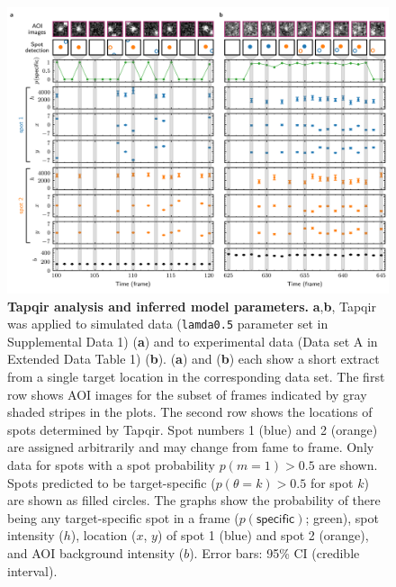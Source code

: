 \begin{figure}[h]
\centering
\includegraphics[width=\textwidth]{figures/figure3.png}
\caption{\textbf{Tapqir analysis and inferred model parameters.} \textbf{a},\textbf{b}, Tapqir was applied to simulated data (\texttt{lamda0.5} parameter set in Supplemental Data 1) (\textbf{a}) and to experimental data (Data set A in Extended Data Table 1) (\textbf{b}). (\textbf{a}) and (\textbf{b}) each show a short extract from a single target location in the corresponding data set. The first row shows AOI images for the subset of frames indicated by gray shaded stripes in the plots. The second row shows the locations of spots determined by Tapqir. Spot numbers 1 (blue) and 2 (orange) are assigned arbitrarily and may change from fame to frame. Only data for spots with a spot probability $p(m=1) > 0.5$ are shown. Spots predicted to be target-specific ($p(\theta=k)>0.5$ for spot $k$) are shown as filled circles. The graphs show the probability of there being any target-specific spot in a frame ($p(\mathsf{specific})$; green), spot intensity ($h$), location ($x$, $y$) of spot 1 (blue) and spot 2 (orange), and AOI background intensity ($b$). Error bars: 95\% CI (credible interval).  }
\label{fig:tapqir_analysis}
\end{figure}


